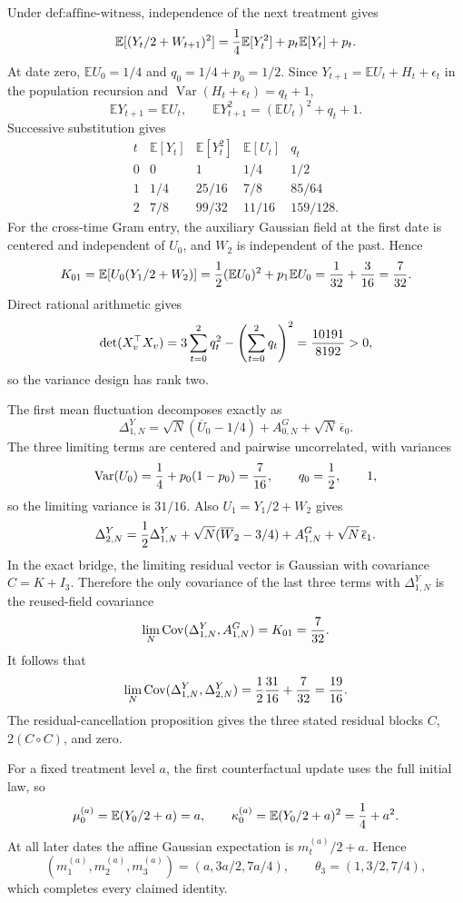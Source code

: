 Under \(\text{def:affine-witness}\), independence of the next treatment gives
\[
 \mathbb E[(Y_t/2+W_{t+1})^2]={1\over4}\mathbb E[Y_t^2]+p_t\mathbb E[Y_t]+p_t.
\]
At date zero, \(\mathbb E U_0=1/4\) and \(q_0=1/4+p_0=1/2\).  Since \(Y_{t+1}=\mathbb E U_t+H_t+\epsilon_t\) in the population recursion and \(\operatorname{Var}(H_t+\epsilon_t)=q_t+1\),
\[
 \mathbb E Y_{t+1}=\mathbb E U_t,
 \qquad \mathbb E Y_{t+1}^2=(\mathbb E U_t)^2+q_t+1.
\]
Successive substitution gives
\[
 \begin{array}{c|c|c|c|c}
 t&\mathbb E[Y_t]&\mathbb E[Y_t^2]&\mathbb E[U_t]&q_t\\\hline
 0&0&1&1/4&1/2\\
 1&1/4&25/16&7/8&85/64\\
 2&7/8&99/32&11/16&159/128.
 \end{array}
\]
For the cross-time Gram entry, the auxiliary Gaussian field at the first date is centered and independent of \(U_0\), and \(W_2\) is independent of the past.  Hence
\[
 K_{01}=\mathbb E[U_0(Y_1/2+W_2)]
 ={1\over2}(\mathbb E U_0)^2+p_1\mathbb E U_0
 ={1\over32}+{3\over16}={7\over32}.
\]
Direct rational arithmetic gives
\[
 \det(X_v^{\top}X_v)=3\sum_{t=0}^2q_t^2-\left(\sum_{t=0}^2q_t\right)^2={10191\over8192}>0,
\]
so the variance design has rank two.

The first mean fluctuation decomposes exactly as
\[
 \Delta_{1,N}^{Y}=\sqrt N(\overline U_0-1/4)+A_{0,N}^{G}+\sqrt N\,\overline\epsilon_0.
\]
The three limiting terms are centered and pairwise uncorrelated, with variances
\[
 \operatorname{Var}(U_0)={1\over4}+p_0(1-p_0)={7\over16},
 \qquad q_0={1\over2},
 \qquad1,
\]
so the limiting variance is \(31/16\).  Also \(U_1=Y_1/2+W_2\) gives
\[
 \Delta_{2,N}^{Y}={1\over2}\Delta_{1,N}^{Y}
 +\sqrt N(\overline W_2-3/4)+A_{1,N}^{G}+\sqrt N\,\overline\epsilon_1.
\]
In the exact bridge, the limiting residual vector is Gaussian with covariance \(C=K+I_3\).  Therefore the only covariance of the last three terms with \(\Delta_{1,N}^{Y}\) is the reused-field covariance
\[
 \lim_N\operatorname{Cov}(\Delta_{1,N}^{Y},A_{1,N}^{G})=K_{01}={7\over32}.
\]
It follows that
\[
 \lim_N\operatorname{Cov}(\Delta_{1,N}^{Y},\Delta_{2,N}^{Y})
 ={1\over2}{31\over16}+{7\over32}={19\over16}.
\]
The residual-cancellation proposition gives the three stated residual blocks \(C\), \(2(C\circ C)\), and zero.

For a fixed treatment level \(a\), the first counterfactual update uses the full initial law, so
\[
 \mu_0^{(a)}=\mathbb E(Y_0/2+a)=a,
 \qquad \kappa_0^{(a)}=\mathbb E(Y_0/2+a)^2={1\over4}+a^2.
\]
At all later dates the affine Gaussian expectation is \(m_t^{(a)}/2+a\).  Hence
\[
 (m_1^{(a)},m_2^{(a)},m_3^{(a)})=(a,3a/2,7a/4),
 \qquad \theta_3=(1,3/2,7/4),
\]
which completes every claimed identity.
